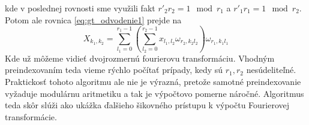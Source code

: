 kde v poslednej rovnosti sme využili fakt $r'_2 r_2 = 1 \mod r_1$
a $r'_1 r_1 = 1 \mod r_2$.
Potom ale rovnica \ref{eq:gt_odvodenie1} prejde na
\begin{equation}
    X_{k_1,k_2} 
            = \sum_{l_1=0}^{r_1-1} 
              \left(
                \sum_{l_2=0}^{r_2-1}
                x_{l_1, l_2} \omega_{r_2, k_2 l_2}  
                \right)
              \omega_{r_1, k_1 l_1} 
\end{equation}
Kde už môžeme vidieť dvojrozmernú fourierovu transformáciu. Vhodným
preindexovaním teda vieme rýchlo počítať prípady, kedy sú $r_1,r_2$
nesúdeliteľné. Praktickosť tohoto algoritmu ale nie je výrazná,
pretože samotné preindexovanie vyžaduje modulárnu aritmetiku a tak je
výpočtovo pomerne náročné. Algoritmus teda skôr slúži ako ukážka
ďalšieho šikovného prístupu k výpočtu Fourierovej transformácie.
